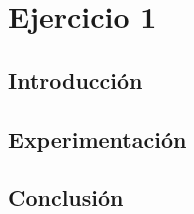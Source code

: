 \section{Ejercicio 1}

\subsection{Introducción}

\subsection{Experimentación}

\subsection{Conclusión}

\newpage
